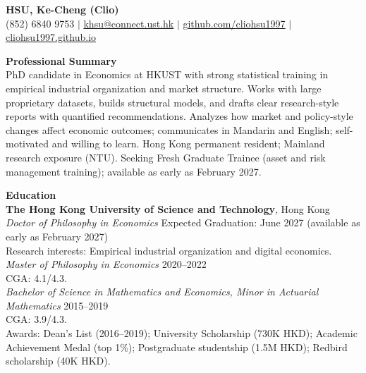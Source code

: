 \documentclass[11pt,letterpaper]{article}
\begin{document}
{\Large \textbf{HSU, Ke-Cheng (Clio)}}\\[1pt]
(852) 6840 9753 \quad $|$ \quad \href{mailto:khsu@connect.ust.hk}{khsu@connect.ust.hk} \quad $|$ \quad \href{https://github.com/cliohsu1997}{github.com/cliohsu1997} \quad $|$ \quad \href{https://cliohsu1997.github.io/}{cliohsu1997.github.io}

\vspace{0.15pt}

{\large \textbf{Professional Summary}}\\[-0.5pt]
PhD candidate in Economics at HKUST with strong statistical training in empirical industrial organization and market structure. Works with large proprietary datasets, builds structural models, and drafts clear research-style reports with quantified recommendations. Analyzes how market and policy-style changes affect economic outcomes; communicates in Mandarin and English; self-motivated and willing to learn. Hong Kong permanent resident; Mainland research exposure (NTU). Seeking Fresh Graduate Trainee (asset and risk management training); available as early as February 2027.

\vspace{0.15pt}

{\large \textbf{Education}}\\[-0.5pt]
\textbf{The Hong Kong University of Science and Technology}, Hong Kong\\
\textit{Doctor of Philosophy in Economics} \hfill Expected Graduation: June 2027 (available as early as February 2027)\\
Research interests: Empirical industrial organization and digital economics.\\
\textit{Master of Philosophy in Economics} \hfill 2020--2022\\
CGA: 4.1/4.3.\\
\textit{Bachelor of Science in Mathematics and Economics, Minor in Actuarial Mathematics} \hfill 2015--2019\\
CGA: 3.9/4.3.\\
Awards: Dean's List (2016--2019); University Scholarship (730K HKD); Academic Achievement Medal (top 1\%); Postgraduate studentship (1.5M HKD); Redbird scholarship (40K HKD).

\vspace{0.15pt}
\end{document}
